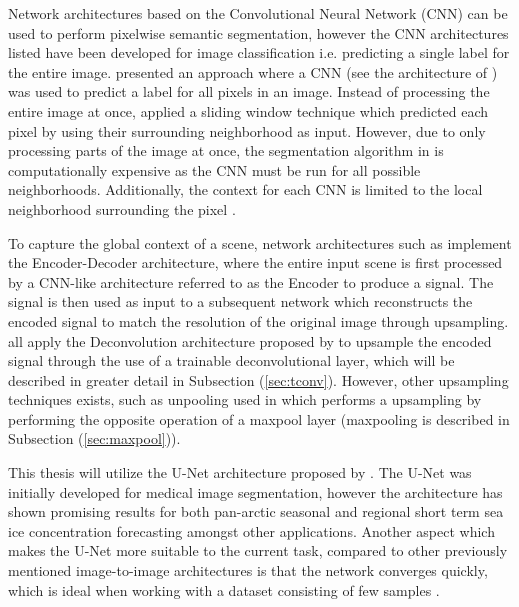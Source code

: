 \documentclass[../main/thesis.tex]{subfiles}
\begin{document}
Network architectures based on the Convolutional Neural Network (CNN) \citep{LeCun1989,Ciresan2012,Krizhevsky2012,Simonyan2014,Szegedy2014,He2015a,Huang2016} can be used to perform pixelwise semantic segmentation, however the CNN architectures listed have been developed for image classification i.e. predicting a single label for the entire image. \citet{Ciresan2012a} presented an approach where a CNN (see the architecture of \citet{Ciresan2012}) was used to predict a label for all pixels in an image. Instead of processing the entire image at once, \citet{Ciresan2012a} applied a sliding window technique which predicted each pixel by using their surrounding neighborhood as input. However, due to only processing parts of the image at once, the segmentation algorithm in \citet{Ciresan2012a} is computationally expensive as the CNN must be run for all possible neighborhoods. Additionally, the context for each CNN is limited to the local neighborhood surrounding the pixel \citep{Ronneberger2015}.

To capture the global context of a scene, network architectures such as \citet{Long2015,Noh2015,Ronneberger2015,Badrinarayanan2017,Chen2018} implement the Encoder-Decoder architecture, where the entire input scene is first processed by a CNN-like architecture referred to as the Encoder to produce a signal. The signal is then used as input to a subsequent network which reconstructs the encoded signal to match the resolution of the original image through upsampling. \citet{Long2015,Ronneberger2015,Badrinarayanan2017} all apply the Deconvolution architecture proposed by \citet{Zeiler2010} to upsample the encoded signal through the use of a trainable deconvolutional layer, which will be described in greater detail in Subsection (\ref{sec:tconv}). However, other upsampling techniques exists, such as unpooling used in \citet{Noh2015} which performs a upsampling by performing the opposite operation of a maxpool layer (maxpooling is described in Subsection (\ref{sec:maxpool})).

This thesis will utilize the U-Net architecture proposed by \citet{Ronneberger2015}. The U-Net was initially developed for medical image segmentation, however the architecture has shown promising results for both pan-arctic seasonal \citep{Andersson2021} and regional short term \citep{Grigoryev2022} sea ice concentration forecasting amongst other applications. Another aspect which makes the U-Net more suitable to the current task, compared to other previously mentioned image-to-image architectures is that the network converges quickly, which is ideal when working with a dataset consisting of few samples \citep{Ronneberger2015}.
\end{document}

